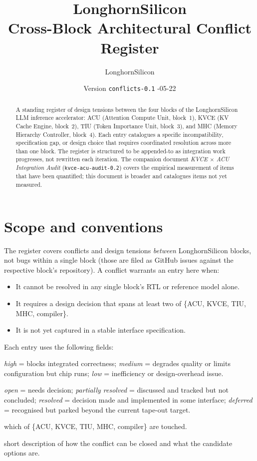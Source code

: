 \documentclass[11pt]{article}
\title{\textbf{LonghornSilicon \\
Cross-Block Architectural Conflict Register}}
\author{LonghornSilicon}
\date{Version \texttt{conflicts-0.1} \quad 2026-05-22}
\begin{document}
\maketitle
\thispagestyle{fancy}

\begin{abstract}
\noindent
A standing register of design tensions between the four blocks of
the LonghornSilicon LLM inference accelerator: ACU (Attention
Compute Unit, block~1), KVCE (KV Cache Engine, block~2), TIU (Token
Importance Unit, block~3), and MHC (Memory Hierarchy Controller,
block~4). Each entry catalogues a specific incompatibility,
specification gap, or design choice that requires coordinated
resolution across more than one block. The register is structured
to be appended-to as integration work progresses, not rewritten
each iteration. The companion document
\textit{KVCE $\times$ ACU Integration Audit} (\texttt{kvce-acu-audit-0.2})
covers the empirical measurement of items that have been quantified;
this document is broader and catalogues items not yet measured.
\end{abstract}

\section{Scope and conventions}
\label{sec:scope}

The register covers conflicts and design tensions \emph{between}
LonghornSilicon blocks, not bugs within a single block (those are
filed as GitHub issues against the respective block's repository).
A conflict warrants an entry here when:

\begin{itemize}
\item It cannot be resolved in any single block's RTL or reference
model alone.
\item It requires a design decision that spans at least two of
\{ACU, KVCE, TIU, MHC, compiler\}.
\item It is not yet captured in a stable interface specification.
\end{itemize}

Each entry uses the following fields:

\begin{description}[leftmargin=2em,style=nextline]
\item[Severity] \textit{high} = blocks integrated correctness;
\textit{medium} = degrades quality or limits configuration but
chip runs; \textit{low} = inefficiency or design-overhead issue.
\item[Status] \textit{open} = needs decision; \textit{partially resolved} =
discussed and tracked but not concluded; \textit{resolved} = decision
made and implemented in some interface; \textit{deferred} = recognised
but parked beyond the current tape-out target.
\item[Affected blocks] which of \{ACU, KVCE, TIU, MHC, compiler\}
are touched.
\item[Resolution path] short description of how the conflict can be
closed and what the candidate options are.
\end{description}
\end{document}
